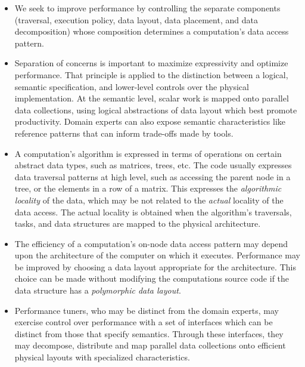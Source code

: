 \begin{itemize}
\item We seek to improve performance by controlling the separate components (traversal, execution policy, data layout, data placement, and data decomposition) whose composition determines a computation's data access pattern. 
%
\item Separation of concerns is important to maximize expressivity and optimize performance. That principle is applied to the distinction between a logical, semantic specification, and lower-level controls over the physical implementation.
 At the semantic level, scalar work is mapped onto parallel data collections, using logical abstractions of data layout which best promote productivity. Domain experts can also expose semantic characteristics like reference patterns that can inform trade-offs made by tools.
%
\item A computation's algorithm is expressed in terms of operations on certain abstract data types, such as matrices, trees, etc. The code usually expresses data traversal patterns at high level, such as accessing the parent node in a tree, or the elements in a row of a matrix. This expresses the {\em algorithmic locality} of the data, which may be not related to the {\em actual} locality of the data access.  The actual locality is obtained when the algorithm's traversals, tasks, and data structures are mapped to the physical architecture. \
%
\item The efficiency of a computation's on-node data access pattern may depend upon the architecture of the computer on which it executes.  Performance may be improved by choosing a data layout appropriate for the architecture.  This choice can be made without modifying the computations source code if the data structure has a {\em polymorphic data layout}.
%
\item Performance tuners, who may be distinct from the domain experts, may exercise control over performance with a set of interfaces which can be distinct from those that specify semantics. 
Through these interfaces, they may decompose, distribute and map parallel data collections onto efficient physical layouts with specialized characteristics.
\end{itemize}

